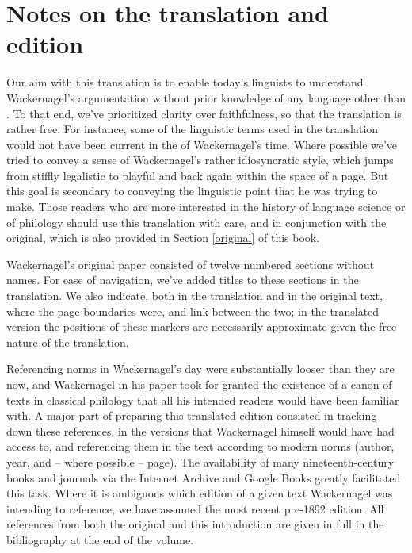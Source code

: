 \section{Notes on the translation and edition}\label{notes-translation}

Our aim with this translation is to enable today's linguists to understand Wackernagel's argumentation without prior knowledge of any language other than . To that end, we've prioritized clarity over faithfulness, so that the translation is rather free. For instance, some of the  linguistic terms used in the translation would not have been current in the  of Wackernagel's time. Where possible we've tried to convey a sense of Wackernagel's rather idiosyncratic style, which jumps from stiffly legalistic to playful and back again within the space of a page. But this goal is secondary to conveying the linguistic point that he was trying to make. Those readers who are more interested in the history of language science or of philology should use this translation with care, and in conjunction with the  original, which is also provided in Section \ref{original} of this book.

Wackernagel's original paper consisted of twelve numbered sections without names. For ease of navigation, we've added titles to these sections in the  translation. We also indicate, both in the translation and in the original text, where the page boundaries were, and link between the two; in the translated version the positions of these markers are necessarily approximate given the free nature of the translation.

Referencing norms in Wackernagel's day were substantially looser than they are now, and Wackernagel in his paper took for granted the existence of a canon of texts in classical philology that all his intended readers would have been familiar with. A major part of preparing this translated edition consisted in tracking down these references, in the versions that Wackernagel himself would have had access to, and referencing them in the text according to modern norms (author, year, and -- where possible -- page). The availability of many nineteenth-century books and journals via the Internet Archive and Google Books greatly facilitated this task. Where it is ambiguous which edition of a given text Wackernagel was intending to reference, we have assumed the most recent pre-1892 edition. All references from both the original and this introduction are given in full in the bibliography at the end of the volume.

